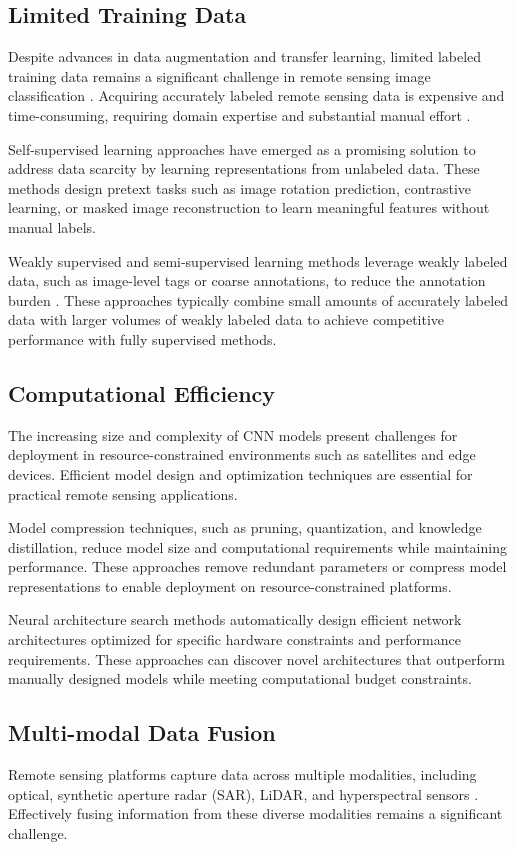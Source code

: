 \documentclass[12pt,a4paper]{article}
\begin{document}
\subsection{Limited Training Data}
Despite advances in data augmentation and transfer learning, limited labeled training data remains a significant challenge in remote sensing image classification \cite{zhu2017deep}. Acquiring accurately labeled remote sensing data is expensive and time-consuming, requiring domain expertise and substantial manual effort \cite{xia2017aid}.

Self-supervised learning approaches have emerged as a promising solution to address data scarcity by learning representations from unlabeled data. These methods design pretext tasks such as image rotation prediction, contrastive learning, or masked image reconstruction to learn meaningful features without manual labels.

Weakly supervised and semi-supervised learning methods leverage weakly labeled data, such as image-level tags or coarse annotations, to reduce the annotation burden \cite{zhang2016weakly}. These approaches typically combine small amounts of accurately labeled data with larger volumes of weakly labeled data to achieve competitive performance with fully supervised methods.

\subsection{Computational Efficiency}
The increasing size and complexity of CNN models present challenges for deployment in resource-constrained environments such as satellites and edge devices. Efficient model design and optimization techniques are essential for practical remote sensing applications.

Model compression techniques, such as pruning, quantization, and knowledge distillation, reduce model size and computational requirements while maintaining performance. These approaches remove redundant parameters or compress model representations to enable deployment on resource-constrained platforms.

Neural architecture search methods automatically design efficient network architectures optimized for specific hardware constraints and performance requirements. These approaches can discover novel architectures that outperform manually designed models while meeting computational budget constraints.

\subsection{Multi-modal Data Fusion}
Remote sensing platforms capture data across multiple modalities, including optical, synthetic aperture radar (SAR), LiDAR, and hyperspectral sensors \cite{zhu2017deep}. Effectively fusing information from these diverse modalities remains a significant challenge.
\end{document}
